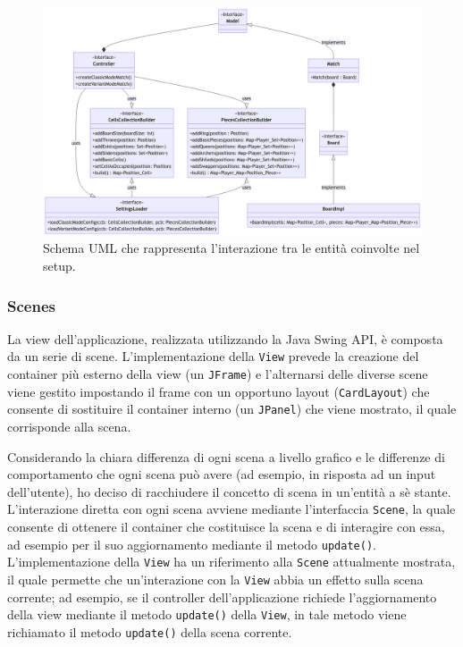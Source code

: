 \documentclass[a4paper,12pt]{report}
\begin{document}
\begin{figure}[H]
\centering
\includegraphics[width=\textwidth]{images/match-setup.png}
\caption{Schema UML che rappresenta l'interazione tra le entità coinvolte nel setup.}
\label{images:match-setup}
\end{figure}

\subsubsection{Scenes}

La view dell'applicazione, realizzata utilizzando la Java Swing API, è composta da un serie di scene.
L'implementazione della \texttt{View} prevede la creazione del container più esterno della view (un \texttt{JFrame}) e l'alternarsi delle diverse scene viene gestito impostando il frame con un opportuno layout (\texttt{CardLayout}) che consente di sostituire il container interno (un \texttt{JPanel}) che viene mostrato, il quale corrisponde alla scena.

Considerando la chiara differenza di ogni scena a livello grafico e le differenze di comportamento che ogni scena può avere (ad esempio, in risposta ad un input dell'utente), ho deciso di racchiudere il concetto di scena in un'entità a sè stante. L'interazione diretta con ogni scena avviene mediante l'interfaccia \texttt{Scene}, la quale consente di ottenere il container che costituisce la scena e di interagire con essa, ad esempio per il suo aggiornamento mediante il metodo \texttt{update()}. L'implementazione della \texttt{View} ha un riferimento alla \texttt{Scene} attualmente mostrata, il quale permette che un'interazione con la \texttt{View} abbia un effetto sulla scena corrente; ad esempio, se il controller dell'applicazione richiede l'aggiornamento della view mediante il metodo \texttt{update()} della \texttt{View}, in tale metodo viene richiamato il metodo \texttt{update()} della scena corrente.
\end{document}
